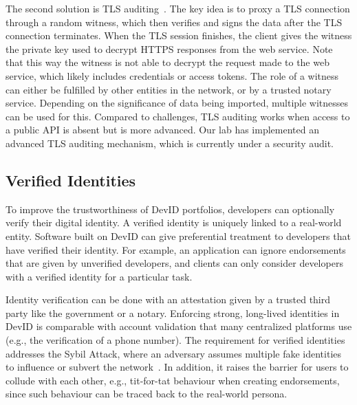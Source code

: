 The second solution is TLS auditing~\cite{tlsnotary2014whitepaper}.
The key idea is to proxy a TLS connection through a random witness, which then verifies and signs the data after the TLS connection terminates.
When the TLS session finishes, the client gives the witness the private key used to decrypt HTTPS responses from the web service.
Note that this way the witness is not able to decrypt the request made to the web service, which likely includes credentials or access tokens.
The role of a witness can either be fulfilled by other entities in the network, or by a trusted notary service.
Depending on the significance of data being imported, multiple witnesses can be used for this.
Compared to challenges, TLS auditing works when access to a public API is absent but is more advanced.
Our lab has implemented an advanced TLS auditing mechanism, which is currently under a security audit.

\subsection{Verified Identities}
\label{subsec:strong_identities}
To improve the trustworthiness of DevID portfolios, developers can optionally verify their digital identity.
A verified identity is uniquely linked to a real-world entity.
Software built on DevID can give preferential treatment to developers that have verified their identity.
For example, an application can ignore endorsements that are given by unverified developers, and clients can only consider developers with a verified identity for a particular task.

Identity verification can be done with an attestation given by a trusted third party like the government or a notary.
Enforcing strong, long-lived identities in DevID is comparable with account validation that many centralized platforms use (e.g., the verification of a phone number).
The requirement for verified identities addresses the Sybil Attack, where an adversary assumes multiple fake identities to influence or subvert the network~\cite{douceur2002sybil}.
In addition, it raises the barrier for users to collude with each other, e.g., tit-for-tat behaviour when creating endorsements, since such behaviour can be traced back to the real-world persona.

